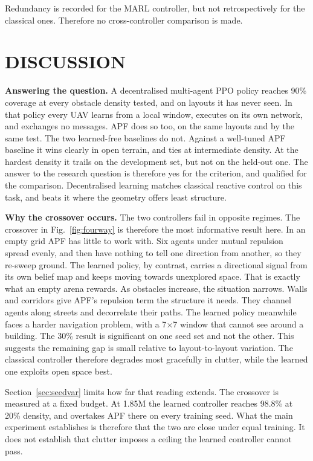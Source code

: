 \documentclass[a4paper, 10pt, conference]{ieeeconf}
\begin{document}
Redundancy is recorded for the MARL controller, but not
retrospectively for the classical ones. Therefore no cross-controller
comparison is made.

\section{DISCUSSION}\label{sec:discussion}

\textbf{Answering the question.} A decentralised multi-agent PPO
policy reaches 90\% coverage at every obstacle density tested, and on
layouts it has never seen. In that policy every UAV learns from a
local window, executes on its own network, and exchanges no messages.
APF does so too, on the same layouts and by the same test. The two
learned-free baselines do not. Against a well-tuned APF baseline it
wins clearly in open terrain, and ties at intermediate density. At the
hardest density it trails on the development set, but not on the
held-out one. The answer to the research question is therefore yes for
the criterion, and qualified for the comparison. Decentralised
learning matches classical reactive control on this task, and beats it
where the geometry offers least structure.

\textbf{Why the crossover occurs.} The two controllers fail in
opposite regimes. The crossover in Fig.~\ref{fig:fourway} is therefore
the most informative result here. In an empty grid APF has little to
work with. Six agents under mutual repulsion spread evenly, and then
have nothing to tell one direction from another, so they re-sweep
ground. The learned policy, by contrast, carries a directional signal
from its own belief map and keeps moving towards unexplored space.
That is exactly what an empty arena rewards. As obstacles increase,
the situation narrows. Walls and corridors give APF's repulsion term
the structure it needs. They channel agents along streets and
decorrelate their paths. The learned policy meanwhile faces a harder
navigation problem, with a 7$\times$7 window that cannot see around a
building. The 30\% result is significant on one seed set and not the
other. This suggests the remaining gap is small relative to
layout-to-layout variation. The classical controller therefore
degrades most gracefully in clutter, while the learned one exploits
open space best.

Section~\ref{sec:seedvar} limits how far that reading extends. The
crossover is measured at a fixed budget. At 1.85M the learned
controller reaches 98.8\% at 20\% density, and overtakes APF there on
every training seed. What the main experiment establishes is therefore
that the two are close under equal training. It does not establish
that clutter imposes a ceiling the learned controller cannot pass.
\end{document}
